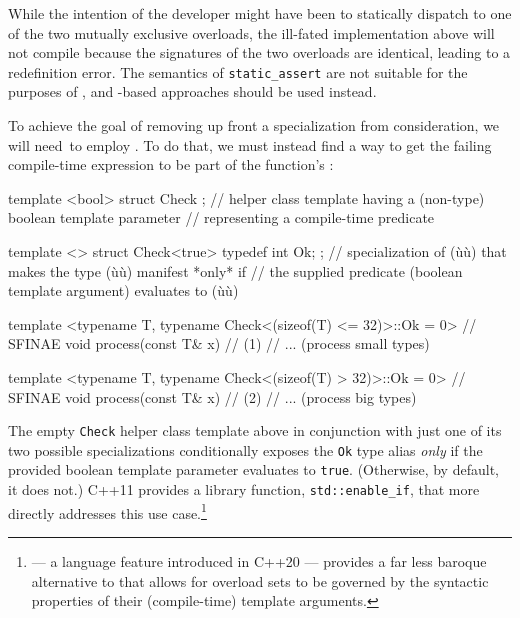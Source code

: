 \noindent While the intention of the developer might have been to statically
dispatch to one of the two mutually exclusive overloads, the ill-fated
implementation above will not compile because the signatures of the two
overloads are identical, leading to a redefinition error. The semantics
of \lstinline!static_assert! are not suitable for the purposes of
, and -based approaches should be used instead.

\enlargethispage*{1ex}
To achieve the goal of removing up
front a specialization from consideration, we will need~to employ
. To do that, we must instead find a way to get the
failing compile-time expression to be part of the function's
:

\begin{emcppslisting}[emcppsbatch=e6]
template <bool> struct Check { };
    // helper class template having a (non-type) boolean template parameter
    // representing a compile-time predicate

template <> struct Check<true> { typedef int Ok; };
    // specialization of (ù{}ù) that makes the type (ù{}ù) manifest *only* if
    // the supplied predicate (boolean template argument) evaluates to (ù{}ù)

template <typename T,
          typename Check<(sizeof(T) <= 32)>::Ok = 0>  // SFINAE
void process(const T& x)  // (1)
{
    // ... (process small types)
}

template <typename T,
          typename Check<(sizeof(T) > 32)>::Ok = 0>  // SFINAE
void process(const T& x)  // (2)
{
    // ... (process big types)
}
\end{emcppslisting}

\noindent The empty \lstinline!Check! helper class template above in conjunction with
just one of its two possible specializations conditionally
exposes the \lstinline!Ok! type alias \emph{only} if the provided boolean
template parameter evaluates to \lstinline!true!. (Otherwise, by default, it
does not.) C++11 provides a library function, \lstinline!std::enable_if!, that more directly addresses this use case.\footnote{ --- a
language feature introduced in C++20 --- provides a far less baroque
alternative to  that allows for overload sets to be governed by
  the syntactic properties of their (compile-time) template arguments.}

